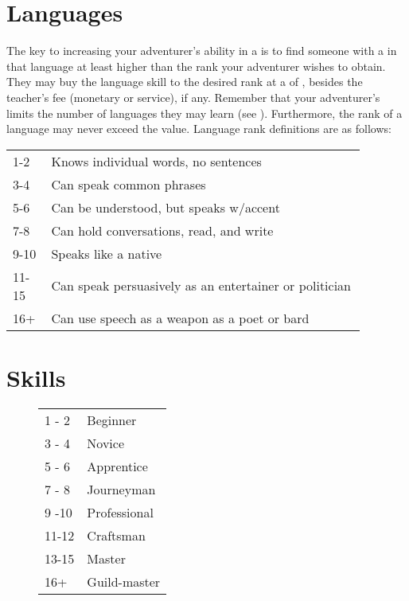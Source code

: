 \begin{multicols*}{2}
\columnbreak
\section{Languages}
The key to increasing your adventurer's ability in a  is to find someone with a  in that language at least  higher than the rank your adventurer wishes to obtain. They may buy the language skill to the desired rank at a  of , besides the teacher's fee (monetary or service), if any. Remember that your adventurer's \INT limits the number of languages they may learn (see ). Furthermore, the rank of a language may never exceed the \INT value. Language rank definitions are as follows:

\begin{normbox}
\begin{tabular}{p{0.085\linewidth} p{0.8\linewidth}}
1-2  & Knows individual words, no sentences\\
3-4  & Can speak common phrases\\
5-6  & Can be understood, but speaks w/accent\\
7-8  & Can hold conversations, read, and write\\
9-10  & Speaks like a native\\
11-15  & Can speak persuasively as an entertainer or politician\\
16+ & Can use speech as a weapon as a poet or bard\\
\end{tabular}
\end{normbox}

\section{Skills}
\begin{wrapfigure}[10]{o}[0pt]{3.75cm}
\begin{normbox}
\begin{tabular}{l l}
1 - 2 & Beginner\\
3 - 4 & Novice\\
5 - 6 & Apprentice\\
7 - 8 & Journeyman\\
9 -10 & Professional\\
11-12 & Craftsman\\
13-15 & Master\\
16+ & Guild-master\\
\end{tabular}
\end{normbox}
\end{wrapfigure}


\end{multicols*}
